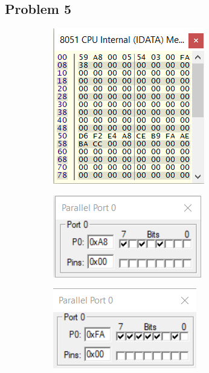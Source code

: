 \documentclass{lab_sheet}
\begin{document}
\subsection*{Problem 5}
\begin{figure}[H]
\hspace*{\fill}
\begin{subfigure}{.5\textwidth}
  \centering
  \includegraphics[frame,width=.8\linewidth]{../Figures/1_5_a.png}   
  \caption{}
  \label{fig:prob5-a}
\end{subfigure}
\hspace*{\fill}
\newline
\begin{subfigure}{.5\textwidth}
  \centering
  \includegraphics[frame,width=.8\linewidth]{../Figures/1_5_b.png}  
  \label{fig:prob5-b}
  \caption{}
\end{subfigure}
\begin{subfigure}{.5\textwidth}
  \centering
  \includegraphics[frame,width=.8\linewidth]{../Figures/1_5_c.png}  

\end{subfigure}
\end{figure}
\end{document}
